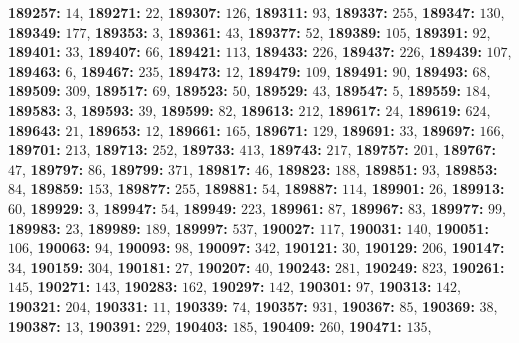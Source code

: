 \textsf{\bfseries 189257:} $14$, \textsf{\bfseries 189271:} $22$, \textsf{\bfseries 189307:} $126$, \textsf{\bfseries 189311:} $93$, \textsf{\bfseries 189337:} $255$, \textsf{\bfseries 189347:} $130$, \textsf{\bfseries 189349:} $177$, \textsf{\bfseries 189353:} $3$, \textsf{\bfseries 189361:} $43$, \textsf{\bfseries 189377:} $52$, \textsf{\bfseries 189389:} $105$, \textsf{\bfseries 189391:} $92$, \textsf{\bfseries 189401:} $33$, \textsf{\bfseries 189407:} $66$, \textsf{\bfseries 189421:} $113$, \textsf{\bfseries 189433:} $226$, \textsf{\bfseries 189437:} $226$, \textsf{\bfseries 189439:} $107$, \textsf{\bfseries 189463:} $6$, \textsf{\bfseries 189467:} $235$, \textsf{\bfseries 189473:} $12$, \textsf{\bfseries 189479:} $109$, \textsf{\bfseries 189491:} $90$, \textsf{\bfseries 189493:} $68$, \textsf{\bfseries 189509:} $309$, \textsf{\bfseries 189517:} $69$, \textsf{\bfseries 189523:} $50$, \textsf{\bfseries 189529:} $43$, \textsf{\bfseries 189547:} $5$, \textsf{\bfseries 189559:} $184$, \textsf{\bfseries 189583:} $3$, \textsf{\bfseries 189593:} $39$, \textsf{\bfseries 189599:} $82$, \textsf{\bfseries 189613:} $212$, \textsf{\bfseries 189617:} $24$, \textsf{\bfseries 189619:} $624$, \textsf{\bfseries 189643:} $21$, \textsf{\bfseries 189653:} $12$, \textsf{\bfseries 189661:} $165$, \textsf{\bfseries 189671:} $129$, \textsf{\bfseries 189691:} $33$, \textsf{\bfseries 189697:} $166$, \textsf{\bfseries 189701:} $213$, \textsf{\bfseries 189713:} $252$, \textsf{\bfseries 189733:} $413$, \textsf{\bfseries 189743:} $217$, \textsf{\bfseries 189757:} $201$, \textsf{\bfseries 189767:} $47$, \textsf{\bfseries 189797:} $86$, \textsf{\bfseries 189799:} $371$, \textsf{\bfseries 189817:} $46$, \textsf{\bfseries 189823:} $188$, \textsf{\bfseries 189851:} $93$, \textsf{\bfseries 189853:} $84$, \textsf{\bfseries 189859:} $153$, \textsf{\bfseries 189877:} $255$, \textsf{\bfseries 189881:} $54$, \textsf{\bfseries 189887:} $114$, \textsf{\bfseries 189901:} $26$, \textsf{\bfseries 189913:} $60$, \textsf{\bfseries 189929:} $3$, \textsf{\bfseries 189947:} $54$, \textsf{\bfseries 189949:} $223$, \textsf{\bfseries 189961:} $87$, \textsf{\bfseries 189967:} $83$, \textsf{\bfseries 189977:} $99$, \textsf{\bfseries 189983:} $23$, \textsf{\bfseries 189989:} $189$, \textsf{\bfseries 189997:} $537$, \textsf{\bfseries 190027:} $117$, \textsf{\bfseries 190031:} $140$, \textsf{\bfseries 190051:} $106$, \textsf{\bfseries 190063:} $94$, \textsf{\bfseries 190093:} $98$, \textsf{\bfseries 190097:} $342$, \textsf{\bfseries 190121:} $30$, \textsf{\bfseries 190129:} $206$, \textsf{\bfseries 190147:} $34$, \textsf{\bfseries 190159:} $304$, \textsf{\bfseries 190181:} $27$, \textsf{\bfseries 190207:} $40$, \textsf{\bfseries 190243:} $281$, \textsf{\bfseries 190249:} $823$, \textsf{\bfseries 190261:} $145$, \textsf{\bfseries 190271:} $143$, \textsf{\bfseries 190283:} $162$, \textsf{\bfseries 190297:} $142$, \textsf{\bfseries 190301:} $97$, \textsf{\bfseries 190313:} $142$, \textsf{\bfseries 190321:} $204$, \textsf{\bfseries 190331:} $11$, \textsf{\bfseries 190339:} $74$, \textsf{\bfseries 190357:} $931$, \textsf{\bfseries 190367:} $85$, \textsf{\bfseries 190369:} $38$, \textsf{\bfseries 190387:} $13$, \textsf{\bfseries 190391:} $229$, \textsf{\bfseries 190403:} $185$, \textsf{\bfseries 190409:} $260$, \textsf{\bfseries 190471:} $135$, 
